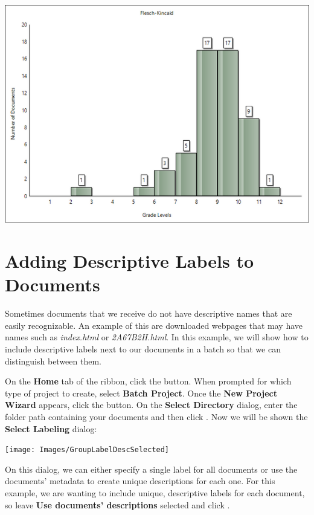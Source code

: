 \documentclass[
]{book}
\theoremstyle{definition}
\theoremstyle{definition}
\theoremstyle{definition}
\theoremstyle{definition}
\theoremstyle{remark}
\begin{document}
\begin{center}\includegraphics[width=0.75\linewidth,]{Images/histoimproved} \end{center}

\newpage

\hypertarget{adding-descriptive-labels-to-documents}{%
\section{Adding Descriptive Labels to Documents}\label{adding-descriptive-labels-to-documents}}

Sometimes documents that we receive do not have descriptive names that are easily recognizable. An example of this are downloaded webpages that may have names such as \emph{index.html} or \emph{2A67B2H.html}. In this example, we will show how to include descriptive labels next to our documents in a batch so that we can distinguish between them.

On the \textbf{Home} tab of the ribbon, click the  button. When prompted for which type of project to create, select \textbf{Batch Project}. Once the \textbf{New Project Wizard} appears, click the  button. On the \textbf{Select Directory} dialog, enter the folder path containing your documents and then click . Now we will be shown the \textbf{Select Labeling} dialog:

\begin{center}\texttt{[image: Images/GroupLabelDescSelected]} \end{center}

On this dialog, we can either specify a single label for all documents or use the documents' metadata to create unique descriptions for each one. For this example, we are wanting to include unique, descriptive labels for each document, so leave \textbf{Use documents' descriptions} selected and click .
\end{document}

